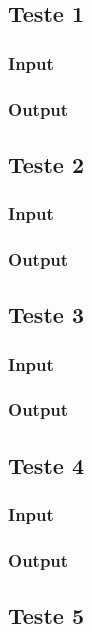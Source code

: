 \documentclass[a4paper,10pt]{report}
\begin{document}
\subsection{Teste 1}
\subsubsection{Input}
\subsubsection{Output}


\subsection{Teste 2}
\subsubsection{Input}
\subsubsection{Output}



\subsection{Teste 3}
\subsubsection{Input}
\subsubsection{Output}


\subsection{Teste 4}
\subsubsection{Input}

\subsubsection{Output}


\subsection{Teste 5}
\end{document}
